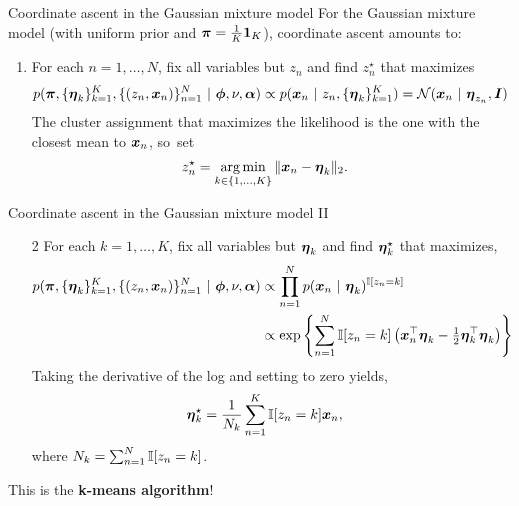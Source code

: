 \documentclass[aspectratio=169]{beamer}
\begin{document}
\begin{frame}{Coordinate ascent in the Gaussian mixture model}
For the Gaussian mixture model (with uniform prior and $\boldsymbol{\pi} = \tfrac{1}{K} \boldsymbol{1}_K$), coordinate ascent amounts to:
\begin{enumerate}
    \item For each $n=1,\ldots, N$, fix all variables but $z_n$ and find $z_n^\star$ that maximizes
    \begin{align}
        p(\boldsymbol{\pi}, \{\boldsymbol{\eta}_k\}_{k=1}^K, \{(z_n, \boldsymbol{x}_n)\}_{n=1}^N ~\vert~ \boldsymbol{\phi}, \nu, \boldsymbol{\alpha})
        &\propto p(\boldsymbol{x}_n ~\vert~ z_n, \{\boldsymbol{\eta}_k\}_{k=1}^K) 
        = \mathcal{N}(\boldsymbol{x}_n ~\vert~ \boldsymbol{\eta}_{z_n}, \boldsymbol{I})
    \end{align}
    The cluster assignment that maximizes the likelihood is the one with the closest mean to $\boldsymbol{x}_n$, so~set
    \begin{align}
        z_n^\star &= \operatorname*{arg\,min}_{k \in \{1,\ldots, K\}} \|\boldsymbol{x}_n - \boldsymbol{\eta}_k\|_2.
    \end{align}
\end{enumerate}
\end{frame}

\begin{frame}{Coordinate ascent in the Gaussian mixture model II}
\begin{enumerate}
    \item[2] For each $k=1,\ldots,K$, fix all variables but $\boldsymbol{\eta}_k$ and find $\boldsymbol{\eta}_k^\star$ that maximizes,
    \begin{align}
        p(\boldsymbol{\pi}, \{\boldsymbol{\eta}_k\}_{k=1}^K, \{(z_n, \boldsymbol{x}_n)\}_{n=1}^N ~\vert~ \boldsymbol{\phi}, \nu, \boldsymbol{\alpha})
        &\propto \prod_{n=1}^N p(\boldsymbol{x}_n ~\vert~ \boldsymbol{\eta}_k)^{\mathbb{I}[z_n=k]} \\
        &\propto \exp \left\{ \sum_{n=1}^N \mathbb{I}[z_n=k] \left(\boldsymbol{x}_n^\top \boldsymbol{\eta}_k - \tfrac{1}{2} \boldsymbol{\eta}_k^\top \boldsymbol{\eta}_k \right) \right\}
    \end{align}
    Taking the derivative of the log and setting to zero yields,
    \begin{align}
        \boldsymbol{\eta}_k^\star &= \frac{1}{N_k} \sum_{n=1}^K \mathbb{I}[z_n=k] \boldsymbol{x}_n,
    \end{align}
    where $N_k = \sum_{n=1}^N \mathbb{I}[z_n=k]$.
\end{enumerate}

This is the \textbf{k-means algorithm}!

\end{frame}
\end{document}
